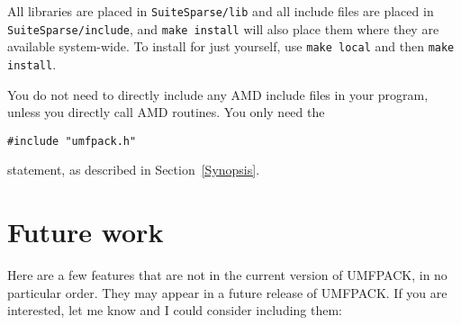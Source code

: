 \documentclass[11pt]{article}
\begin{document}
All libraries are placed in {\tt SuiteSparse/lib} and all include files are
placed in {\tt SuiteSparse/include}, and \verb'make install' will also place
them where they are available system-wide.  To install for just yourself, use
\verb'make local' and then \verb'make install'.

You do not need to directly include any AMD include files in your
program, unless you directly call AMD routines.  You only need the
\begin{verbatim}
#include "umfpack.h"
\end{verbatim}
statement, as described in Section~\ref{Synopsis}.

\section{Future work}
\label{Future}

Here are a few features that are not in the current version of UMFPACK,
in no particular
order.  They may appear in a future release of UMFPACK.  If you are interested,
let me know and I could consider including them:
\end{document}
